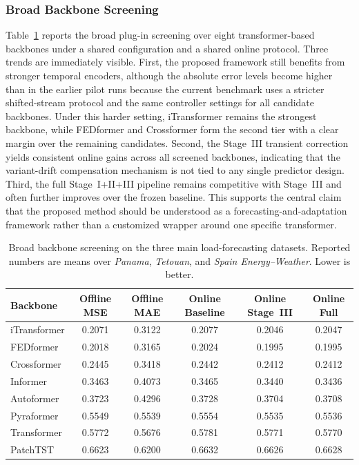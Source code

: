 ﻿\documentclass[journal]{IEEEtran}
\newenvironment{auditproblemblock}{\begingroup\color{red}}{\endgroup}
\begin{document}
\subsubsection{Broad Backbone Screening}
\begin{auditproblemblock}
Table~\ref{tab:backbone_screening} reports the broad plug-in screening over eight transformer-based backbones under a shared configuration and a shared online protocol. Three trends are immediately visible. First, the proposed framework still benefits from stronger temporal encoders, although the absolute error levels become higher than in the earlier pilot runs because the current benchmark uses a stricter shifted-stream protocol and the same controller settings for all candidate backbones. Under this harder setting, iTransformer remains the strongest backbone, while FEDformer and Crossformer form the second tier with a clear margin over the remaining candidates. Second, the Stage~III transient correction yields consistent online gains across all screened backbones, indicating that the variant-drift compensation mechanism is not tied to any single predictor design. Third, the full Stage~I+II+III pipeline remains competitive with Stage~III and often further improves over the frozen baseline. This supports the central claim that the proposed method should be understood as a forecasting-and-adaptation framework rather than a customized wrapper around one specific transformer.

\begin{table}[t]
\caption{Broad backbone screening on the three main load-forecasting datasets. Reported numbers are means over \textit{Panama}, \textit{Tetouan}, and \textit{Spain Energy--Weather}. Lower is better.}
\label{tab:backbone_screening}
\centering
\begin{tabular}{lccccc}
\toprule
Backbone & Offline MSE & Offline MAE & Online Baseline & Online Stage~III & Online Full \\
\midrule
iTransformer & 0.2071 & 0.3122 & 0.2077 & 0.2046 & 0.2047 \\
FEDformer & 0.2018 & 0.3165 & 0.2024 & 0.1995 & 0.1995 \\
Crossformer & 0.2445 & 0.3418 & 0.2442 & 0.2412 & 0.2412 \\
Informer & 0.3463 & 0.4073 & 0.3465 & 0.3440 & 0.3436 \\
Autoformer & 0.3723 & 0.4296 & 0.3728 & 0.3704 & 0.3708 \\
Pyraformer & 0.5549 & 0.5539 & 0.5554 & 0.5535 & 0.5536 \\
Transformer & 0.5772 & 0.5676 & 0.5781 & 0.5771 & 0.5770 \\
PatchTST & 0.6623 & 0.6200 & 0.6632 & 0.6626 & 0.6628 \\
\bottomrule
\end{tabular}
\end{table}


\end{auditproblemblock}
\end{document}
